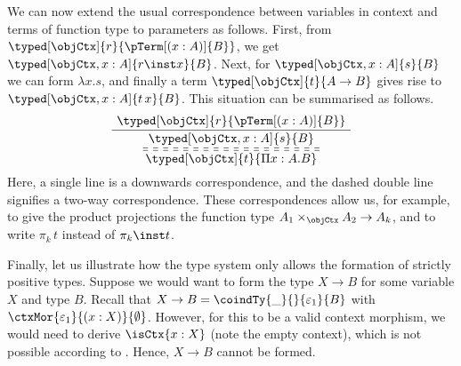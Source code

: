 \documentclass[preprint]{sigplanconf}
\begin{document}
\begin{example}
  We can now extend the usual correspondence between variables in context and
  terms of function type to parameters as follows.
  First, from $\typed[\objCtx]{r}{\pTerm[(x : A)]{B}}$, we get
  $\typed[\objCtx, x : A]{r \inst x}{B}$.
  Next, for $\typed[\objCtx, x : A]{s}{B}$ we can form $\lambda x. s$, and
  finally a term $\typed[\objCtx]{t}{A \to B}$ gives rise to
  $\typed[\objCtx, x : A]{t \, x}{B}$.
  This situation can be summarised as follows.
  \begin{equation*}
    \AxiomC{$\typed[\objCtx]{r}{\pTerm[(x : A)]{B}}$}
    \UnaryInfC{$\typed[\objCtx, x : A]{s}{B}$}
    \doubleLine \dashedLine
    \UnaryInfC{$\typed[\objCtx]{t}{\Pi x:A. B}$}
    \DisplayProof
  \end{equation*}
  Here, a single line is a downwards correspondence, and the dashed double line
  signifies a two-way correspondence.
  These correspondences allow us, for example, to give the product projections
  the function type $A_1 \times_\objCtx A_2 \to A_k$, and to write
  $\pi_k \, t$ instead of $\pi_k \inst t$.

  Finally, let us illustrate how the type system only
  allows the formation of strictly positive types.
  Suppose we would want to form the type
  $X \to B$ for some variable $X$ and type $B$.
  Recall that
  $X \to B = \cramped{\coindTy{\_}{}{\varepsilon_1}{B}}$ with
  $\ctxMor{\varepsilon_1}{(x : X)}{\emptyset}$.
  However, for this to be a valid context morphism, we would need to derive
  $\isCtx{x:X}$ (note the empty context), which is not possible according to
  .
  Hence, $X \to B$ cannot be formed.
  \qedDef
\end{example}
\end{document}
